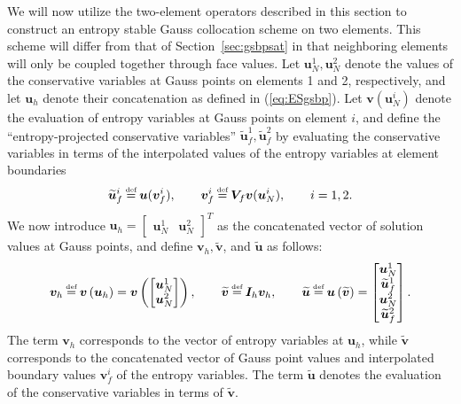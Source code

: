 \documentclass[review,onefignum,onetabnum,final]{siamart171218}
\renewcommand{\tilde}{\widetilde}
\newcommand{\LRp}[1]{\left( #1 \right)}
\newcommand\myeq{\mathrel{\stackrel{\makebox[0pt]{\mbox{\normalfont\tiny def}}}{=}}}
\begin{document}
We will now utilize the two-element operators described in this section to construct an entropy stable Gauss collocation scheme on two elements.  This scheme will differ from that of Section~\ref{sec:gsbpsat} in that neighboring elements will only be coupled together through face values.  
Let $\bm{u}^1_N, \bm{u}^2_N$ denote the values of the conservative variables at Gauss points on elements 1 and 2, respectively, and let $\bm{u}_h$ denote their concatenation as defined in (\ref{eq:ESgsbp}).  Let $\bm{v}(\bm{u}^i_N)$ denote the evaluation of entropy variables at Gauss points on element $i$, and define the ``entropy-projected conservative variables'' $\tilde{\bm{u}}^1_f, \tilde{\bm{u}}^2_f$ by evaluating the conservative variables in terms of the  interpolated values of the entropy variables at element boundaries 
\[
\tilde{\bm{u}}^i_f \myeq \bm{u}(\bm{v}^i_f), \qquad \bm{v}^i_f \myeq \bm{V}_f\bm{v}(\bm{u}^i_N), \qquad i = 1,2. 
\]
We now introduce $\bm{u}_h = \begin{bmatrix}\bm{u}^1_N & \bm{u}^2_N\end{bmatrix}^T$ as the concatenated vector of solution values at Gauss points, and define $\bm{v}_h, \tilde{\bm{v}}$, and $\tilde{\bm{u}}$ as follows:  
\[
\bm{v}_h \myeq \bm{v}\LRp{\bm{u}_h} = \bm{v}\LRp{\begin{bmatrix}
{\bm{u}^1_N}\\
{\bm{u}^2_N}
\end{bmatrix}}, \qquad \tilde{\bm{v}} \myeq \bm{I}_h\bm{v}_h, \qquad \tilde{\bm{u}} \myeq \bm{u}\LRp{\tilde{\bm{v}}} = 
\begin{bmatrix}
\bm{u}^1_N \\
\tilde{\bm{u}}^1_f \\
\bm{u}^2_N \\
\tilde{\bm{u}}^2_f
\end{bmatrix}.  
\]
The term $\bm{v}_h$ corresponds to the vector of entropy variables at $\bm{u}_h$, while $\tilde{\bm{v}}$ corresponds to the concatenated vector of Gauss point values and interpolated boundary values $\bm{v}^i_f$ of the entropy variables.  The term $\tilde{\bm{u}}$ denotes the evaluation of the conservative variables in terms of $\tilde{\bm{v}}$.  
\end{document}
